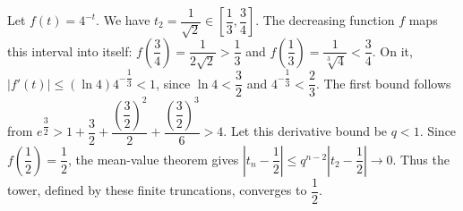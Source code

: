 Let $f(t)=4^{-t}$. We have $t_2=\dfrac{1}{\sqrt2}\in[\dfrac{1}{3},\dfrac{3}{4}]$. The decreasing function $f$ maps this interval into itself: $f(\dfrac{3}{4})=\dfrac{1}{2\sqrt2}>\dfrac{1}{3}$ and $f(\dfrac{1}{3})=\dfrac{1}{\sqrt[3]4}<\dfrac{3}{4}$. On it, $|f'(t)|\le(\ln4)4^{-\dfrac{1}{3}}<1$, since $\ln4<\dfrac{3}{2}$ and $4^{-\dfrac{1}{3}}<\dfrac{2}{3}$. The first bound follows from $e^{\dfrac{3}{2}}>1+\dfrac{3}{2}+\dfrac{(\dfrac{3}{2})^2}{2}+\dfrac{(\dfrac{3}{2})^3}{6}>4$. Let this derivative bound be $q<1$. Since $f(\dfrac{1}{2})=\dfrac{1}{2}$, the mean-value theorem gives $|t_n-\dfrac{1}{2}|\le q^{n-2}|t_2-\dfrac{1}{2}|\to0$. Thus the tower, defined by these finite truncations, converges to $\boxed{\dfrac{1}{2}}$.
